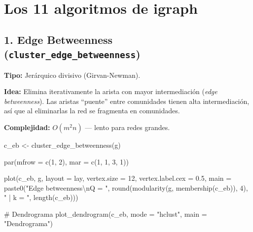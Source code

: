 \documentclass[
  letterpaper,
  DIV=11,
  numbers=noendperiod]{scrreprt}
\newenvironment{Shaded}{\begin{snugshade}}{\end{snugshade}}
\newcommand{\AttributeTok}[1]{\textcolor[rgb]{0.40,0.45,0.13}{#1}}
\newcommand{\CommentTok}[1]{\textcolor[rgb]{0.37,0.37,0.37}{#1}}
\newcommand{\DecValTok}[1]{\textcolor[rgb]{0.68,0.00,0.00}{#1}}
\newcommand{\FloatTok}[1]{\textcolor[rgb]{0.68,0.00,0.00}{#1}}
\newcommand{\FunctionTok}[1]{\textcolor[rgb]{0.28,0.35,0.67}{#1}}
\newcommand{\NormalTok}[1]{\textcolor[rgb]{0.00,0.23,0.31}{#1}}
\newcommand{\OtherTok}[1]{\textcolor[rgb]{0.00,0.23,0.31}{#1}}
\newcommand{\SpecialCharTok}[1]{\textcolor[rgb]{0.37,0.37,0.37}{#1}}
\newcommand{\StringTok}[1]{\textcolor[rgb]{0.13,0.47,0.30}{#1}}
\begin{document}
\section{Los 11 algoritmos de igraph}\label{los-11-algoritmos-de-igraph}

\subsection{\texorpdfstring{1. Edge Betweenness
(\texttt{cluster\_edge\_betweenness})}{1. Edge Betweenness (cluster\_edge\_betweenness)}}\label{edge-betweenness-cluster_edge_betweenness}

\textbf{Tipo:} Jerárquico divisivo (Girvan-Newman).

\textbf{Idea:} Elimina iterativamente la arista con mayor intermediación
(\emph{edge betweenness}). Las aristas ``puente'' entre comunidades
tienen alta intermediación, así que al eliminarlas la red se fragmenta
en comunidades.

\textbf{Complejidad:} \(O(m^2 n)\) --- lento para redes grandes.

\begin{Shaded}
\begin{Highlighting}[]
\NormalTok{c\_eb }\OtherTok{\textless{}{-}} \FunctionTok{cluster\_edge\_betweenness}\NormalTok{(g)}

\FunctionTok{par}\NormalTok{(}\AttributeTok{mfrow =} \FunctionTok{c}\NormalTok{(}\DecValTok{1}\NormalTok{, }\DecValTok{2}\NormalTok{), }\AttributeTok{mar =} \FunctionTok{c}\NormalTok{(}\DecValTok{1}\NormalTok{, }\DecValTok{1}\NormalTok{, }\DecValTok{3}\NormalTok{, }\DecValTok{1}\NormalTok{))}

\FunctionTok{plot}\NormalTok{(c\_eb, g, }\AttributeTok{layout =}\NormalTok{ lay,}
     \AttributeTok{vertex.size =} \DecValTok{12}\NormalTok{, }\AttributeTok{vertex.label.cex =} \FloatTok{0.5}\NormalTok{,}
     \AttributeTok{main =} \FunctionTok{paste0}\NormalTok{(}\StringTok{"Edge betweenness}\SpecialCharTok{\textbackslash{}n}\StringTok{Q = "}\NormalTok{, }\FunctionTok{round}\NormalTok{(}\FunctionTok{modularity}\NormalTok{(g, }\FunctionTok{membership}\NormalTok{(c\_eb)), }\DecValTok{4}\NormalTok{),}
                   \StringTok{" | k = "}\NormalTok{, }\FunctionTok{length}\NormalTok{(c\_eb)))}

\CommentTok{\# Dendrograma}
\FunctionTok{plot\_dendrogram}\NormalTok{(c\_eb, }\AttributeTok{mode =} \StringTok{"hclust"}\NormalTok{,}
                \AttributeTok{main =} \StringTok{"Dendrograma"}\NormalTok{)}
\end{Highlighting}
\end{Shaded}
\end{document}
